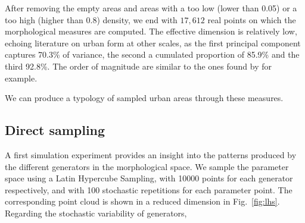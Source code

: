 \documentclass[letterpaper]{article}
\begin{document}
After removing the empty areas and areas with a too low (lower than 0.05) or a too high (higher than 0.8) density, we end with $17,612$ real points on which the morphological measures are computed. The effective dimension is relatively low, echoing literature on urban form at other scales, as the first principal component captures 70.3\% of variance, the second a cumulated proportion of 85.9\% and the third 92.8\%. The order of magnitude are similar to the ones found by \cite{Schwarz201029} for example.


We can produce a typology of sampled urban areas through these measures.






\subsection{Direct sampling}

A first simulation experiment provides an insight into the patterns produced by the different generators in the morphological space. We sample the parameter space using a Latin Hypercube Sampling, with 10000 points for each generator respectively, and with 100 stochastic repetitions for each parameter point. The corresponding point cloud is shown in a reduced dimension in Fig.~\ref{fig:lhs}.
Regarding the stochastic variability of generators, %
\end{document}

